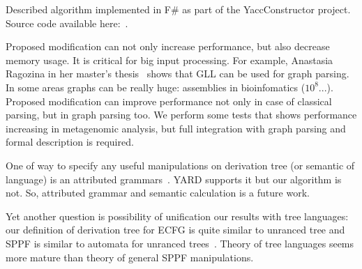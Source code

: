 \documentclass[runningheads,a4paper]{llncs}
\begin{document}
Described algorithm implemented in F\# as part of the YaccConstructor project.
Source code available here:~\cite{YaccConstructor}.

Proposed modification can not only increase performance, but also decrease memory usage. 
It is critical for big input processing.
For example, Anastasia Ragozina in her master's thesis~\cite{ragozina} shows that GLL can be used for graph parsing.  
In some areas graphs can be really huge: assemblies in bioinfomatics ($10^8$...).
Proposed modification can improve performance not only in case of classical parsing, but in graph parsing too. 
We perform some tests that shows performance increasing in metagenomic analysis, but full integration with graph parsing and formal description is required.

One of way to specify any useful manipulations on derivation tree (or semantic of language) is an attributed grammars~\cite{!!!}.
YARD supports it but our algorithm is not.
So, attributed grammar and semantic calculation is a future work.

Yet another question is possibility of unification our results with tree languages: our definition of derivation tree for ECFG is quite similar to unranced tree and SPPF is similar to automata for unranced trees~\cite{TATA}.
Theory of tree languages seems more mature than theory of general SPPF manipulations.





\end{document}
